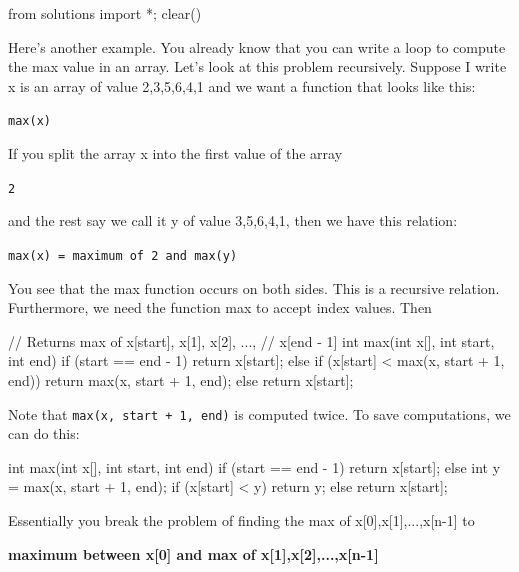 \begin{python0}
from solutions import *; clear()
\end{python0}

Here's another example. You already know that you can
write a loop to compute the max value in an array. Let's
look at this problem recursively. Suppose I write x is an array of
value 2,3,5,6,4,1 and we want a function that looks like this:

\verb!max(x)!

If you split the array x into the first value of the array

\verb!2!

and the rest say we call it y of value 3,5,6,4,1, then we have this
relation:

\verb!max(x) = maximum of 2 and max(y)!

You see that the max function occurs on both sides. This is a recursive
relation. Furthermore, we need the function max to accept index values.
Then

\begin{consolethree}[escapeinside=||]
// Returns max of x[start], x[1], x[2], ...,
// x[end - 1]
int max(int x[], int start, int end)
{
    if (start == end - 1)
    {
        return x[start];
    }
    else
    {
        if (x[start] < max(x, start + 1, end))
        {
            return max(x, start + 1, end);
        }
        else
        {
            return x[start];
        }
    }
}
\end{consolethree}

Note that \texttt{max(x, start + 1, end)} is computed twice. To save
computations, we can do this:

\begin{consolethree}[escapeinside=||]
int max(int x[], int start, int end)
{
    if (start == end - 1)
    {
        return x[start];
    }
    else
    {
        int y = max(x, start + 1, end);
        if (x[start] < y)
        {
            return y;
        }
        else
        {
            return x[start];
        }
    }
}
\end{consolethree}

Essentially you break the problem of finding the max of
x[0],x[1],...,x[n-1] to

\textbf{maximum between x[0] and max of x[1],x[2],...,x[n-1]}







